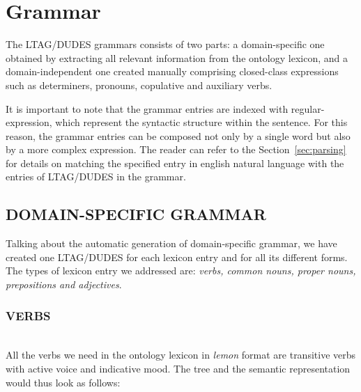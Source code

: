\section{Grammar}
\label{sec:grammar}

The LTAG/DUDES grammars consists of two parts: a domain-specific one obtained by extracting all relevant information from the ontology lexicon, and a domain-independent one created manually comprising closed-class expressions such as determiners, pronouns, copulative and auxiliary verbs.

It is important to note that the grammar entries are indexed with regular-expression, which represent the syntactic structure within the sentence. For this reason, the grammar entries can be composed not only by a single word but also by a more complex expression. The reader can refer to the Section~\ref{sec:parsing} for details on matching the specified entry in english natural language with the entries of LTAG/DUDES in the grammar.

\subsection{DOMAIN-SPECIFIC GRAMMAR}
Talking about the automatic generation of domain-specific grammar, we have created one LTAG/DUDES for each lexicon entry and for all its different forms. The types of lexicon entry we addressed are: \textit{verbs, common nouns, proper nouns, prepositions and adjectives}.

\subsubsection{VERBS}\mbox{}\\
All the verbs we need in the ontology lexicon in \textit{lemon} format are transitive verbs with active voice and indicative mood. The tree and the semantic representation would thus look as follows:

